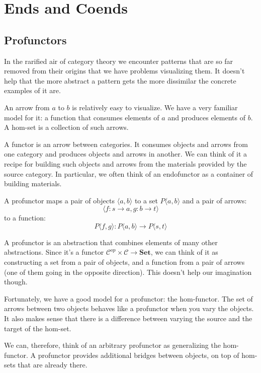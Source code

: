 \documentclass[DaoFP]{subfiles}
\begin{document}
\setcounter{chapter}{17}

\chapter{Ends and Coends}

\section{Profunctors}

In the rarified air of category theory we encounter patterns that are so far removed from their origins that we have problems visualizing them. It doesn't help that the more abstract a pattern gets the more dissimilar the concrete examples of it are. 

An arrow from $a$ to $b$ is relatively easy to visualize. We have a very familiar model for it: a function that consumes elements of $a$ and produces elements of $b$. A hom-set is a collection of such arrows. 

A functor is an arrow between categories. It consumes objects and arrows from one category and produces objects and arrows in another. We can think of it a recipe for building such objects and arrows from the materials provided by the source category. In particular, we  often think of an endofunctor as a container of building materials.

A profunctor maps a pair of objects $\langle a, b \rangle$ to a set $P\langle a, b \rangle$ and a pair of arrows:
\[ \langle f \colon s \to a, g \colon b \to t \rangle \]
to a function:
\[ P\langle f, g \rangle \colon P\langle a, b \rangle \to P\langle s, t \rangle\]

A profunctor is an abstraction that combines elements of many other abstractions. Since it's a functor $ \mathcal{C}^{op} \times  \mathcal{C} \to \mathbf{Set}$, we can think of it as constructing a set from a pair of objects, and a function from a pair of arrows (one of them going in the opposite direction). This doesn't help our imagination though.

Fortunately, we have a good model for a profunctor: the hom-functor. The set of arrows between two objects behaves like a profunctor when you vary the objects. It also makes sense that there is a difference between varying the source and the target of the hom-set. 

We can, therefore, think of an arbitrary profunctor as generalizing the hom-functor. A profunctor provides additional bridges between objects, on top of hom-sets that are already there. 
\end{document}
